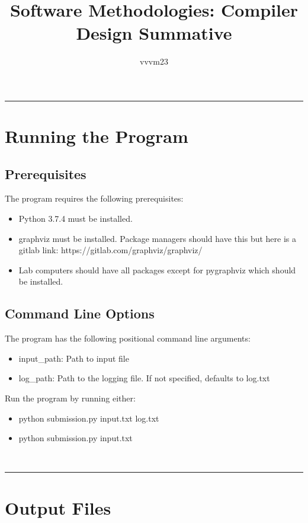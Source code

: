 \documentclass[11pt,a4paper]{article}
\begin{document}
\title{Software Methodologies: Compiler Design Summative}
\author{vvvm23}
\date{}
\maketitle
\hrule

\section{Running the Program}

\subsection{Prerequisites}

The program requires the following prerequisites:

\begin{itemize}
    \item Python 3.7.4 must be installed.
    \item graphviz must be installed. Package managers should have this but here is a gitlab link: https://gitlab.com/graphviz/graphviz/
    \item Lab computers should have all packages except for pygraphviz which should be installed.
\end{itemize}

\subsection{Command Line Options}

The program has the following positional command line arguments:
\begin{itemize}
    \item input\_path: Path to input file
    \item log\_path: Path to the logging file. If not specified, defaults to log.txt
\end{itemize}
Run the program by running either:
\begin{itemize}
    \item python submission.py input.txt log.txt
    \item python submission.py input.txt
\end{itemize}
\\

\hrule

\section{Output Files}
\end{document}
